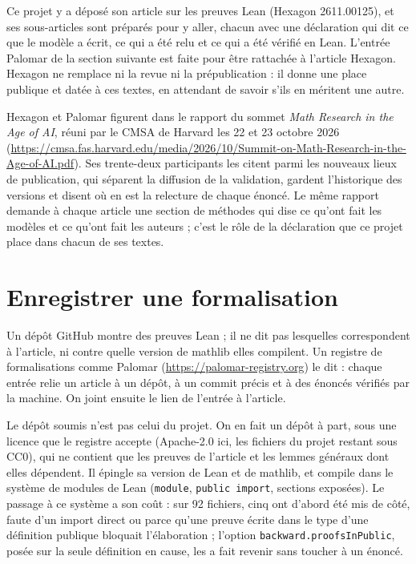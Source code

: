 Ce projet y a déposé son article sur les preuves Lean (Hexagon 2611.00125), et ses
sous-articles sont préparés pour y aller, chacun avec une déclaration qui dit ce que le modèle a écrit, ce qui a été relu et ce qui a été
vérifié en Lean. L'entrée Palomar de la section suivante est faite pour être
rattachée à l'article Hexagon. Hexagon ne remplace ni la revue ni la prépublication : il donne une place
publique et datée à ces textes, en attendant de savoir s'ils en méritent une autre.

Hexagon et Palomar figurent dans le rapport du sommet \emph{Math Research in the Age of AI},
réuni par le CMSA de Harvard les 22 et 23 octobre 2026
(\url{https://cmsa.fas.harvard.edu/media/2026/10/Summit-on-Math-Research-in-the-Age-of-AI.pdf}).
Ses trente-deux participants les citent parmi les nouveaux lieux de publication, qui séparent
la diffusion de la validation, gardent l'historique des versions et disent où en est la
relecture de chaque énoncé. Le même rapport demande à chaque article une section de méthodes
qui dise ce qu'ont fait les modèles et ce qu'ont fait les auteurs ; c'est le rôle de la
déclaration que ce projet place dans chacun de ses textes.

\section{Enregistrer une formalisation}

Un dépôt GitHub montre des preuves Lean ; il ne dit pas lesquelles correspondent à
l'article, ni contre quelle version de mathlib elles compilent. Un registre de
formalisations comme Palomar (\url{https://palomar-registry.org}) le dit : chaque entrée
relie un article à un dépôt, à un commit précis et à des énoncés vérifiés par la machine.
On joint ensuite le lien de l'entrée à l'article.

Le dépôt soumis n'est pas celui du projet. On en fait un dépôt à part, sous une licence que
le registre accepte (Apache-2.0 ici, les fichiers du projet restant sous CC0), qui ne
contient que les preuves de l'article et les lemmes généraux dont elles dépendent. Il
épingle sa version de Lean et de mathlib, et compile dans le système de modules de Lean
(\texttt{module}, \texttt{public import}, sections exposées). Le passage à ce système a son
coût : sur 92 fichiers, cinq ont d'abord été mis de côté, faute d'un import direct ou
parce qu'une preuve écrite dans le type d'une définition publique bloquait l'élaboration ;
l'option \texttt{backward.proofsInPublic}, posée sur la seule définition en cause, les a
fait revenir sans toucher à un énoncé.

